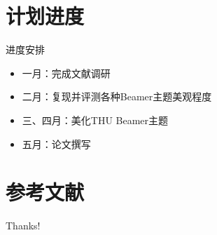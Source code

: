 \documentclass[aspectratio=169]{beamer}
\begin{document}
\section{计划进度}

\begin{frame}{进度安排}
    \begin{itemize}
        \item 一月：完成文献调研
        \item 二月：复现并评测各种Beamer主题美观程度
        \item 三、四月：美化THU Beamer主题
        \item 五月：论文撰写
    \end{itemize}
\end{frame}

\section{参考文献}

\begin{frame}[allowframebreaks]
    \printbibliography
\end{frame}


\begin{frame}
    \begin{center}
        {\Huge\calligra Thanks!}
    \end{center}
\end{frame}
\end{document}
